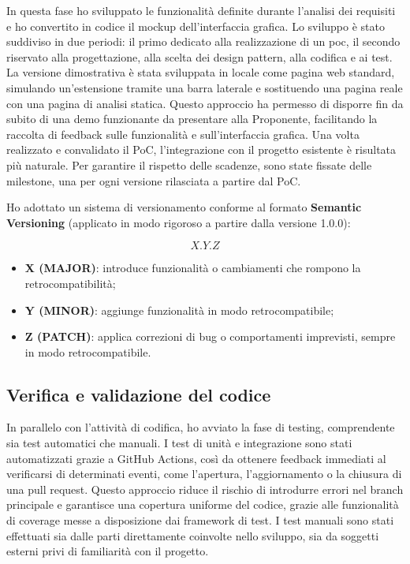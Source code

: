 \par In questa fase ho sviluppato le funzionalità definite durante l’analisi dei requisiti e ho convertito in codice il mockup dell’interfaccia grafica. Lo sviluppo è stato suddiviso in due periodi: il primo dedicato alla realizzazione di un \gls{poc}, il secondo riservato alla progettazione, alla scelta dei design pattern, alla codifica e ai test. La versione dimostrativa è stata sviluppata in locale come pagina web standard, simulando un’estensione tramite una barra laterale e sostituendo una pagina reale con una pagina di analisi statica. Questo approccio ha permesso di disporre fin da subito di una demo funzionante da presentare alla Proponente, facilitando la raccolta di feedback sulle funzionalità e sull’interfaccia grafica. Una volta realizzato e convalidato il PoC, l’integrazione con il progetto esistente è risultata più naturale. Per garantire il rispetto delle scadenze, sono state fissate delle milestone, una per ogni versione rilasciata a partire dal PoC.

\vspace{10pt}
\par\noindent Ho adottato un sistema di versionamento conforme al formato \textbf{Semantic Versioning} (applicato in modo rigoroso a partire dalla versione 1.0.0):

\[
X.Y.Z
\]

\begin{itemize}
  \item \textbf{X (MAJOR)}: introduce funzionalità o cambiamenti che rompono  la retrocompatibilità;
  \item \textbf{Y (MINOR)}: aggiunge funzionalità in modo retrocompatibile;
  \item \textbf{Z (PATCH)}: applica correzioni di bug o comportamenti imprevisti, sempre in modo retrocompatibile.
\end{itemize}

\subsection{Verifica e validazione del codice}

\par In parallelo con l’attività di codifica, ho avviato la fase di testing, comprendente sia test automatici che manuali. I test di unità e integrazione sono stati automatizzati grazie a GitHub Actions, così da ottenere feedback immediati al verificarsi di determinati eventi, come l’apertura, l’aggiornamento o la chiusura di una pull request. Questo approccio riduce il rischio di introdurre errori nel branch principale e garantisce una copertura uniforme del codice, grazie alle funzionalità di coverage messe a disposizione dai framework di test. I test manuali sono stati effettuati sia dalle parti direttamente coinvolte nello sviluppo, sia da soggetti esterni privi di familiarità con il progetto.

